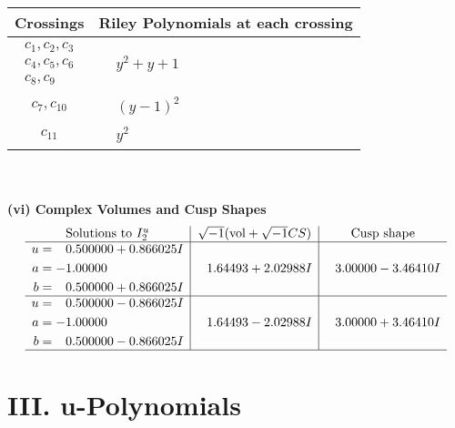 \documentclass[1p]{elsarticle_modified}
\theoremstyle{definition}
\newcommand{\I}{\sqrt{-1}}
\begin{document}
\begin{tabular}{m{50pt}|m{274pt}}
Crossings & \hspace{64pt}Riley Polynomials at each crossing \\
\hline $$\begin{aligned}c_{1},c_{2},c_{3}\\c_{4},c_{5},c_{6}\\c_{8},c_{9}\end{aligned}$$&$\begin{aligned}
&y^2+y+1
\end{aligned}$\\
\hline $$\begin{aligned}c_{7},c_{10}\end{aligned}$$&$\begin{aligned}
&(y-1)^2
\end{aligned}$\\
\hline $$\begin{aligned}c_{11}\end{aligned}$$&$\begin{aligned}
&y^2
\end{aligned}$\\
\hline
\end{tabular}\\~\\
\newpage\flushleft \textbf{(vi) Complex Volumes and Cusp Shapes}
$$\begin{array}{c|c|c}  
\text{Solutions to }I^u_{2}& \I (\text{vol} + \sqrt{-1}CS) & \text{Cusp shape}\\
 \hline 
\begin{aligned}
u &= \phantom{-}0.500000 + 0.866025 I \\
a &= -1.00000\phantom{ +0.000000I} \\
b &= \phantom{-}0.500000 + 0.866025 I\end{aligned}
 & \phantom{-}1.64493 + 2.02988 I & \phantom{-}3.00000 - 3.46410 I \\ \hline\begin{aligned}
u &= \phantom{-}0.500000 - 0.866025 I \\
a &= -1.00000\phantom{ +0.000000I} \\
b &= \phantom{-}0.500000 - 0.866025 I\end{aligned}
 & \phantom{-}1.64493 - 2.02988 I & \phantom{-}3.00000 + 3.46410 I\\
 \hline 
 \end{array}$$\newpage
\newpage\renewcommand{\arraystretch}{1}
\centering \section*{ III. u-Polynomials}
\end{document}
